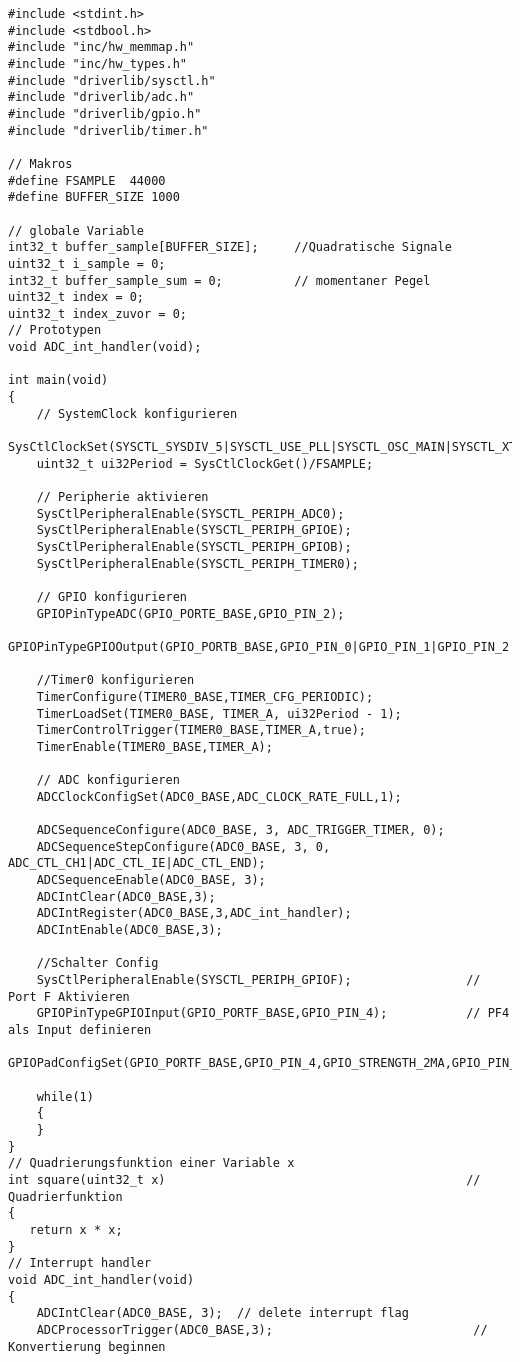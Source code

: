 \begin{lstlisting}
#include <stdint.h>
#include <stdbool.h>
#include "inc/hw_memmap.h"
#include "inc/hw_types.h"
#include "driverlib/sysctl.h"
#include "driverlib/adc.h"
#include "driverlib/gpio.h"
#include "driverlib/timer.h"

// Makros
#define FSAMPLE  44000
#define BUFFER_SIZE 1000

// globale Variable
int32_t buffer_sample[BUFFER_SIZE];     //Quadratische Signale
uint32_t i_sample = 0;
int32_t buffer_sample_sum = 0;          // momentaner Pegel
uint32_t index = 0;
uint32_t index_zuvor = 0;
// Prototypen
void ADC_int_handler(void);

int main(void)
{
    // SystemClock konfigurieren
    SysCtlClockSet(SYSCTL_SYSDIV_5|SYSCTL_USE_PLL|SYSCTL_OSC_MAIN|SYSCTL_XTAL_16MHZ);
    uint32_t ui32Period = SysCtlClockGet()/FSAMPLE;

    // Peripherie aktivieren
    SysCtlPeripheralEnable(SYSCTL_PERIPH_ADC0);
    SysCtlPeripheralEnable(SYSCTL_PERIPH_GPIOE);
    SysCtlPeripheralEnable(SYSCTL_PERIPH_GPIOB);
    SysCtlPeripheralEnable(SYSCTL_PERIPH_TIMER0);

    // GPIO konfigurieren
    GPIOPinTypeADC(GPIO_PORTE_BASE,GPIO_PIN_2);
    GPIOPinTypeGPIOOutput(GPIO_PORTB_BASE,GPIO_PIN_0|GPIO_PIN_1|GPIO_PIN_2|GPIO_PIN_3|GPIO_PIN_4|GPIO_PIN_5|GPIO_PIN_6|GPIO_PIN_7);

    //Timer0 konfigurieren
    TimerConfigure(TIMER0_BASE,TIMER_CFG_PERIODIC);
    TimerLoadSet(TIMER0_BASE, TIMER_A, ui32Period - 1);
    TimerControlTrigger(TIMER0_BASE,TIMER_A,true);
    TimerEnable(TIMER0_BASE,TIMER_A);

    // ADC konfigurieren
    ADCClockConfigSet(ADC0_BASE,ADC_CLOCK_RATE_FULL,1);

    ADCSequenceConfigure(ADC0_BASE, 3, ADC_TRIGGER_TIMER, 0);
    ADCSequenceStepConfigure(ADC0_BASE, 3, 0, ADC_CTL_CH1|ADC_CTL_IE|ADC_CTL_END);
    ADCSequenceEnable(ADC0_BASE, 3);
    ADCIntClear(ADC0_BASE,3);
    ADCIntRegister(ADC0_BASE,3,ADC_int_handler);
    ADCIntEnable(ADC0_BASE,3);

    //Schalter Config
    SysCtlPeripheralEnable(SYSCTL_PERIPH_GPIOF);                // Port F Aktivieren
    GPIOPinTypeGPIOInput(GPIO_PORTF_BASE,GPIO_PIN_4);           // PF4 als Input definieren
    GPIOPadConfigSet(GPIO_PORTF_BASE,GPIO_PIN_4,GPIO_STRENGTH_2MA,GPIO_PIN_TYPE_STD_WPU);

    while(1)
    {
    }
}
// Quadrierungsfunktion einer Variable x
int square(uint32_t x)                                          // Quadrierfunktion
{
   return x * x;
}
// Interrupt handler
void ADC_int_handler(void)
{
    ADCIntClear(ADC0_BASE, 3);  // delete interrupt flag
    ADCProcessorTrigger(ADC0_BASE,3);                            // Konvertierung beginnen


\end{lstlisting}
